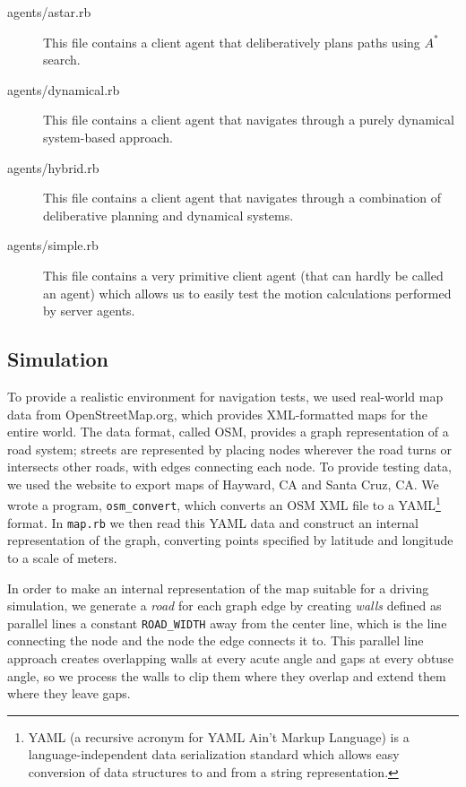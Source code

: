 \documentclass{article}
\newcommand{\code}{\texttt}
\begin{document}
\begin{description}
\item[agents/astar.rb] This file contains a client agent that deliberatively
  plans paths using $A^*$ search.

\item[agents/dynamical.rb] This file contains a client agent that navigates
  through a purely dynamical system-based approach.

\item[agents/hybrid.rb] This file contains a client agent that navigates through
  a combination of deliberative planning and dynamical systems.

\item[agents/simple.rb] This file contains a very primitive client agent (that
  can hardly be called an agent) which allows us to easily test the motion
  calculations performed by server agents.

\end{description}

\subsection{Simulation}
To provide a realistic environment for navigation tests, we used real-world map
data from OpenStreetMap.org, which provides XML-formatted maps for the entire
world. The data format, called OSM, provides a graph representation of a road
system; streets are represented by placing nodes wherever the road turns or
intersects other roads, with edges connecting each node. To provide testing
data, we used the website to export maps of Hayward, CA and Santa Cruz, CA. We
wrote a program, \code{osm\_convert}, which converts an OSM XML file to a
YAML\footnote{YAML (a recursive acronym for YAML Ain't Markup Language) is a
  language-independent data serialization standard which allows easy conversion
  of data structures to and from a string representation.} format. In
\code{map.rb} we then read this YAML data and construct an internal
representation of the graph, converting points specified by latitude and
longitude to a scale of meters.

In order to make an internal representation of the map suitable for a driving
simulation, we generate a \emph{road} for each graph edge by creating
\emph{walls} defined as parallel lines a constant \code{ROAD\_WIDTH} away from
the center line, which is the line connecting the node and the node the edge
connects it to. This parallel line approach creates overlapping walls at every
acute angle and gaps at every obtuse angle, so we process the walls to clip them
where they overlap and extend them where they leave gaps.
\end{document}
